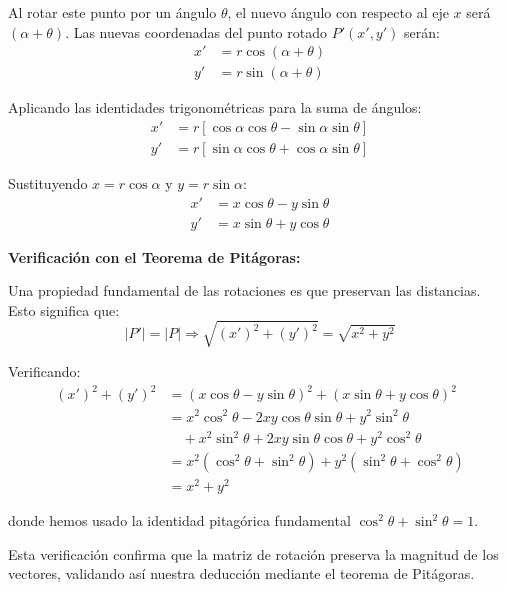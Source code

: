 Al rotar este punto por un ángulo $\theta$, el nuevo ángulo con respecto al eje $x$ será $(\alpha + \theta)$. Las nuevas coordenadas del punto rotado $P'(x', y')$ serán:
\begin{align*}
x' &= r \cos(\alpha + \theta) \\
y' &= r \sin(\alpha + \theta)
\end{align*}

Aplicando las identidades trigonométricas para la suma de ángulos:
\begin{align*}
x' &= r[\cos \alpha \cos \theta - \sin \alpha \sin \theta] \\
y' &= r[\sin \alpha \cos \theta + \cos \alpha \sin \theta]
\end{align*}

Sustituyendo $x = r \cos \alpha$ y $y = r \sin \alpha$:
\begin{align*}
x' &= x \cos \theta - y \sin \theta \\
y' &= x \sin \theta + y \cos \theta
\end{align*}

\textbf{Verificación con el Teorema de Pitágoras:}

Una propiedad fundamental de las rotaciones es que preservan las distancias. Esto significa que:
\begin{equation}\label{eq:preservacion_distancia}
|P'| = |P| \Rightarrow \sqrt{(x')^2 + (y')^2} = \sqrt{x^2 + y^2}
\end{equation}

Verificando:
\begin{align*}
(x')^2 + (y')^2 &= (x \cos \theta - y \sin \theta)^2 + (x \sin \theta + y \cos \theta)^2 \\
&= x^2 \cos^2 \theta - 2xy \cos \theta \sin \theta + y^2 \sin^2 \theta \\
&\quad + x^2 \sin^2 \theta + 2xy \sin \theta \cos \theta + y^2 \cos^2 \theta \\
&= x^2(\cos^2 \theta + \sin^2 \theta) + y^2(\sin^2 \theta + \cos^2 \theta) \\
&= x^2 + y^2
\end{align*}

donde hemos usado la identidad pitagórica fundamental $\cos^2 \theta + \sin^2 \theta = 1$.

Esta verificación confirma que la matriz de rotación preserva la magnitud de los vectores, validando así nuestra deducción mediante el teorema de Pitágoras.
